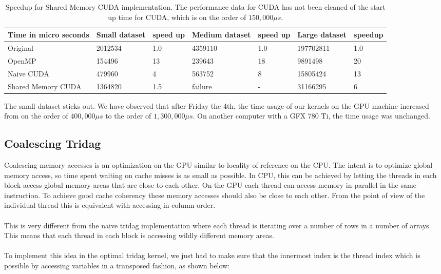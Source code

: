 \documentclass{article}
\begin{document}
\begin{table}[ht]
\centering
\caption{Speedup for Shared Memory CUDA implementation. The performance data for CUDA has not been cleaned of the start up time for CUDA, which is on the order of $150,000 \mu s$.\newline}
\label{cuda-shmem}
\begin{tabular}{|l|l|l|l|l|l|l|}
\hline
Time in micro seconds & Small dataset & speed up & Medium dataset & speed up & Large dataset & speedup   \\ \hline
Original         & 2012534       &  1.0        & 4359110        &  1.0        & 197702811     &  1.0      \\ \hline
OpenMP           & 154496        &  13         & 239643         &  18         & 9891498       &  20       \\ \hline
Naive CUDA       & 479960        &  4          & 563752         &  8          & 15805424      &  13       \\ \hline
Shared Memory CUDA & 1364820     &  1.5        & failure        &  -          & 31166295      &  6        \\ \hline
\end{tabular}
\end{table}

The small dataset sticks out. We have observed that after Friday the 4th, the time usage of our kernels on the GPU machine increased from on the order of $400,000 \mu s$ to the order of $1,300,000 \mu s$. On another computer with a GFX 780 Ti, the time usage was unchanged.

\subsection*{Coalescing Tridag}
Coalescing memory accesses is an optimization on the GPU similar to locality of reference on the CPU. The intent is to optimize global memory access, so time spent waiting on cache misses is as small as possible. In CPU, this can be achieved by letting the threads in each block access global memory areas that are close to each other. On the GPU each thread can access memory in parallel in the same instruction. To achieve good cache coherency these memory accesses should also be close to each other. From the point of view of the individual thread this is equivalent with accessing in column order. \\\\
This is very different from the naive tridag implementation where each thread is iterating over a number of rows in a number of arrays. This means that each thread in each block is accessing wildly different memory areas.\\\\
To implement this idea in the optimal tridag kernel, we just had to make sure that the innermost index is the thread index which is possible by accessing variables in a transposed fashion, as shown below:
\end{document}
